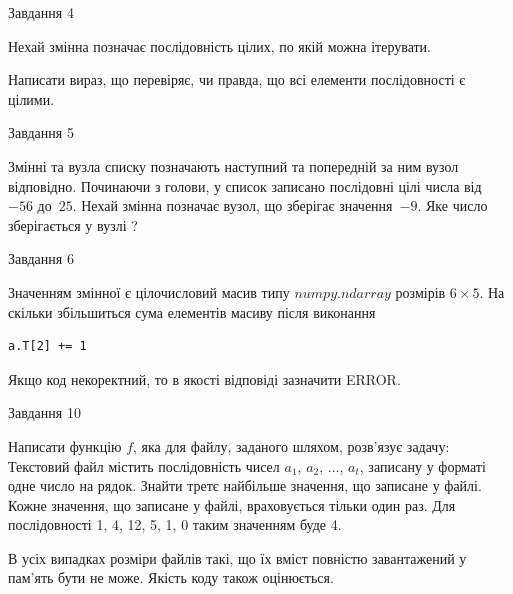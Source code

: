 \documentclass[12pt, ukrainian]{article}
\begin{document}
{               
{\begin{center}Завдання {4}\end{center}}
\vspace{-6mm}
Нехай змінна  позначає послідовність цілих, по якій можна ітерувати.

Написати вираз, що перевіряє, чи правда, що всі елементи послідовності є цілими.\par

\vspace{10mm}
               
{\begin{center}Завдання {5}\end{center}}
\vspace{-6mm}
Змінні  та  вузла списку позначають наступний та попередній за ним вузол відповідно. Починаючи з голови, у список записано послідовні цілі числа від~$-56$ до~$25$. Нехай змінна  позначає вузол, що зберігає значення~$-9$.
Яке число зберігається у вузлі  ?\par

               
{\begin{center}Завдання {6}\end{center}}
\vspace{-6mm}
Значенням змінної  є цілочисловий масив типу $numpy.ndarray$ розмірів $6{\times}5$. На скільки збільшиться сума елементів масиву  після виконання
\begin{verbatim}
a.T[2] += 1
\end{verbatim}


Якщо код некоректний, то в якості відповіді зазначити ERROR.\par

               
{\begin{center}Завдання {10}\end{center}}
\vspace{-6mm}

Написати функцію $f$, яка для файлу, заданого шляхом, розв’язує задачу:\\ Текстовий файл містить послідовність чисел $a_1$, $a_2$, $\ldots$, $a_t$, записану у форматі одне число на рядок. Знайти третє найбільше значення, що записане у файлі. Кожне значення, що записане у файлі, враховується тільки один раз. Для послідовності 1, 4, 12, 5, 1, 0 таким значенням буде 4.

В усіх випадках розміри файлів такі, що їх вміст повністю завантажений у пам'ять бути не може. Якість коду також оцінюється.



}
\end{document}
